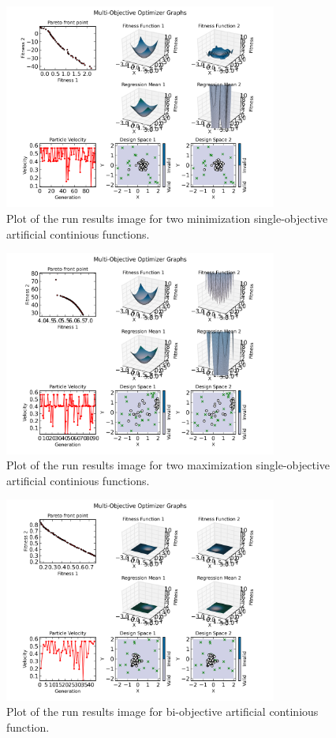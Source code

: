 \documentclass[12pt, runningheads,a4paper]{llncs}
\begin{document}
\begin{figure}
        \centering
    \centering
\includegraphics[width=0.8\textwidth]{./figs/shron.png}
        \caption{Plot of the run results image for two minimization single-objective artificial continious functions.}\label{fig:shron}
\end{figure}

\begin{figure}
        \centering
    \centering
\includegraphics[width=0.8\textwidth]{./figs/max.png}
        \caption{Plot of the run results image for two maximization single-objective artificial continious functions.}\label{fig:max}
\end{figure}

\begin{figure}
        \centering
    \centering
\includegraphics[width=0.8\textwidth]{./figs/fosna.png}
        \caption{Plot of the run results image for bi-objective artificial continious function.}\label{fig:fonseca}
\end{figure}
\end{document}
